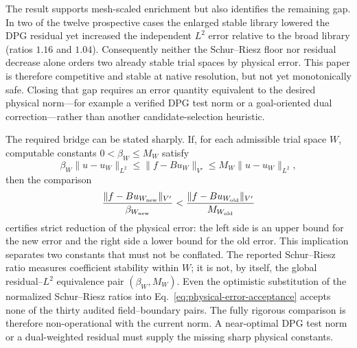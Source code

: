 \documentclass[11pt]{article}
\numberwithin{algorithm}{section}
\theoremstyle{definition}\newtheorem{definition}[theorem]{Definition}
\theoremstyle{remark}\newtheorem{remark}[theorem]{Remark}
\begin{document}
The result supports mesh-scaled enrichment but also identifies the remaining
gap.  In two of the twelve prospective cases the enlarged stable library
lowered the DPG residual yet increased the independent $L^2$ error relative to
the broad library (ratios $1.16$ and $1.04$).  Consequently neither the
Schur--Riesz floor nor residual decrease alone orders two already stable trial
spaces by physical error.  This paper is therefore competitive and
stable at native resolution, but not yet monotonically safe.  Closing that gap
requires an error quantity equivalent to the desired physical norm---for
example a verified DPG test norm or a goal-oriented dual correction---rather
than another candidate-selection heuristic.

The required bridge can be stated sharply.  If, for each admissible trial
space $W$, computable constants $0<\beta_W\leq M_W$ satisfy
\[
 \beta_W\|u-u_W\|_{L^2}\leq \|f-Bu_W\|_{V'}
 \leq M_W\|u-u_W\|_{L^2},
\]
then the comparison
\begin{equation}
 \frac{\|f-Bu_{W_{\rm new}}\|_{V'}}{\beta_{W_{\rm new}}}
 <
 \frac{\|f-Bu_{W_{\rm old}}\|_{V'}}{M_{W_{\rm old}}}
 \label{eq:physical-error-acceptance}
\end{equation}
certifies strict reduction of the physical error: the left side is an upper
bound for the new error and the right side a lower bound for the old error.
This implication separates two constants that must not be conflated.  The
reported Schur--Riesz ratio measures coefficient stability within $W$; it is
not, by itself, the global residual--$L^2$ equivalence pair
$(\beta_W,M_W)$.  Even the optimistic substitution of the normalized
Schur--Riesz ratios into Eq.~\eqref{eq:physical-error-acceptance} accepts none
of the thirty audited field--boundary pairs.  The fully rigorous comparison
is therefore non-operational with the current norm.  A near-optimal DPG test
norm or a dual-weighted residual must supply the missing sharp physical
constants.
\end{document}
